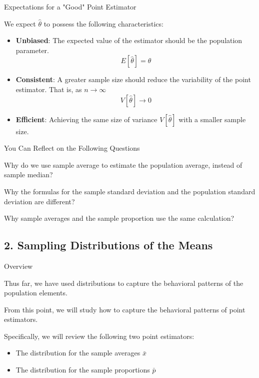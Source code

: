 \documentclass{beamer}
\begin{document}
\begin{frame}{Expectations for a "Good" Point Estimator}

We expect $\hat{\theta}$ to possess the following characteristics: 
\begin{itemize}
\item \textbf{Unbiased}: The expected value of the estimator should be the population parameter.
$$E\left[ \hat{\theta}\right]  = \theta $$
\item \textbf{Consistent}: A greater sample size should reduce the variability of the point estimator. That is, as $n \rightarrow \infty $
$$V\left[ \hat{\theta}\right] \rightarrow 0 $$ 
\item \textbf{Efficient}: Achieving the same size of variance $V\left[ \hat{\theta}\right]$ with a smaller sample size. 
\end{itemize}
\end{frame}




\begin{frame}{You Can Reflect on the Following Questions}

Why do we use sample average to estimate the population average, instead of sample median? 

\vspace{0.3 cm}
Why the formulas for the sample standard deviation and the population standard deviation are different? 

\vspace{0.3 cm}
Why sample averages and the sample proportion use the same calculation?

\end{frame}


\subsection{2. Sampling Distributions of the Means}
\begin{frame}
\subsectionpage
\end{frame}

\begin{frame}{Overview}

Thus far, we have used distributions to capture the behavioral patterns of the population elements. 

\vspace{0.3 cm}
From this point, we will study how to capture the behavioral patterns of point estimators. 

\vspace{0.3 cm}
Specifically, we will review the following two point estimators: 
\begin{itemize}
\item The distribution for the sample averages $\bar{x}$
\item The distribution for the sample proportions $\bar{p}$

\end{itemize}

\end{frame}
\end{document}
